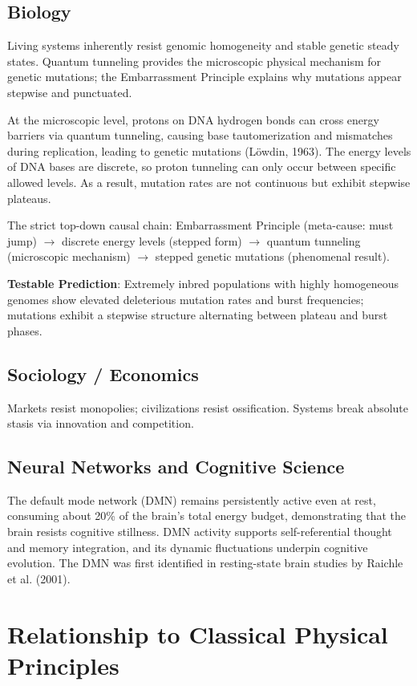 \documentclass[10pt,a4paper]{article}
\begin{document}
\subsection{Biology}
Living systems inherently resist genomic homogeneity and stable genetic steady states. Quantum tunneling provides the microscopic physical mechanism for genetic mutations; the Embarrassment Principle explains why mutations appear stepwise and punctuated.

At the microscopic level, protons on DNA hydrogen bonds can cross energy barriers via quantum tunneling, causing base tautomerization and mismatches during replication, leading to genetic mutations (Löwdin, 1963). The energy levels of DNA bases are discrete, so proton tunneling can only occur between specific allowed levels. As a result, mutation rates are not continuous but exhibit stepwise plateaus.

The strict top-down causal chain:
Embarrassment Principle (meta-cause: must jump) $\rightarrow$ discrete energy levels (stepped form) $\rightarrow$ quantum tunneling (microscopic mechanism) $\rightarrow$ stepped genetic mutations (phenomenal result).

\textbf{Testable Prediction}: Extremely inbred populations with highly homogeneous genomes show elevated deleterious mutation rates and burst frequencies; mutations exhibit a stepwise structure alternating between plateau and burst phases.

\subsection{Sociology / Economics}
Markets resist monopolies; civilizations resist ossification. Systems break absolute stasis via innovation and competition.

\subsection{Neural Networks and Cognitive Science}
The default mode network (DMN) remains persistently active even at rest, consuming about 20\% of the brain’s total energy budget, demonstrating that the brain resists cognitive stillness. DMN activity supports self-referential thought and memory integration, and its dynamic fluctuations underpin cognitive evolution. The DMN was first identified in resting-state brain studies by Raichle et al. (2001).

\section{Relationship to Classical Physical Principles}
\end{document}
